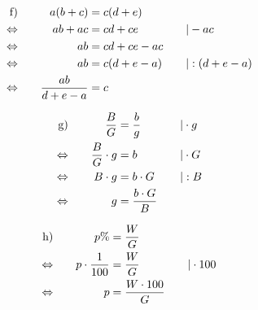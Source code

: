 \begin{exercise}
\begin{minipage}[t]{0.51\linewidth}
      \begin{alignat*}{3}
        \text{f)}&\quad
        &
        a(b+c)&=c(d+e)
        &
        \quad&\relax
        \\
        \Leftrightarrow&\quad
        &
        ab+ac&=cd+ce
        &
        \quad&|-ac
        \\
        \Leftrightarrow&\quad
        &
        ab&=cd+ce-ac
        &
        \quad&\relax
        \\
        \Leftrightarrow&\quad
        &
        ab&=c(d+e-a)
        &
        \quad&|:(d+e-a)
        \\
        \Leftrightarrow&\quad
        &
        \frac{ab}{d+e-a}&=c
        &
        \quad&\relax
      \end{alignat*}
    \end{minipage}
    \begin{minipage}[t]{0.47\linewidth}
      \makeatletter\@fleqntrue\makeatother
      \begin{alignat*}{3}
        \text{g)}&\quad
        &
        \frac{B}{G}&=\frac{b}{g}
        &
        \quad&|\cdot g
        \\
        \Leftrightarrow&\quad
        &
        \frac{B}{G}\cdot g&=b
        &
        \quad&|\cdot G
        \\
        \Leftrightarrow&\quad
        &
        B\cdot g&=b\cdot G
        &
        \quad&|:B
        \\
        \Leftrightarrow&\quad
        &
        g&=\frac{b\cdot G}{B}
        &
        \quad&\relax
      \end{alignat*}
    \end{minipage}\hfill
    \begin{minipage}[t]{0.51\linewidth}
      \makeatletter\@fleqntrue\makeatother
      \begin{alignat*}{3}
        \text{h)}&\quad
        &
        p\%&=\frac{W}{G}
        &
        \quad&\relax
        \\
        \Leftrightarrow&\quad
        &
        p\cdot\frac{1}{100}&=\frac{W}{G}
        &
        \quad&|\cdot100
        \\
        \Leftrightarrow&\quad
        &
        p&=\frac{W\cdot100}{G}
        &
        \quad&\relax
      \end{alignat*}
    \end{minipage}

\end{exercise}
